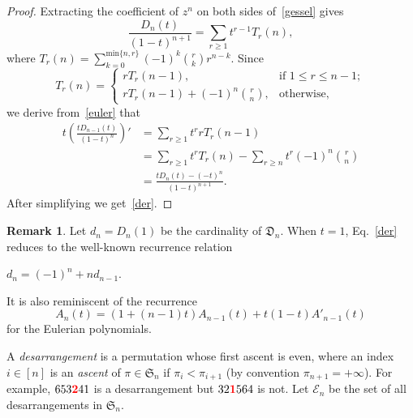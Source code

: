 \documentclass[12pt]{amsart}
\numberwithin{equation}{section}
\def\red{\textcolor{red}}
\theoremstyle{plain}
\theoremstyle{definition}
\newtheorem{remark}[theorem]{Remark}
\def\min{\mathrm{min}}
\def\S{\mathfrak{S}}
\def\D{\mathfrak{D}}
\def\E{\mathcal{E}}
\begin{document}
 \begin{proof}
 Extracting the coefficient of $z^n$ on both sides of~\eqref{gessel} gives
 \begin{equation}\label{euler}
 \frac{D_n(t)}{(1-t)^{n+1}}=\sum_{r\geq1}t^{r-1}T_r(n),
 \end{equation}
 where 
$T_r(n)=\sum_{k=0}^{\min\{n,r\}}(-1)^k{r\choose k}r^{n-k}$. Since
 $$
 T_r(n)=
 \begin{cases}
 rT_r(n-1), &\text{if $1\leq r\leq n-1$};\\
 rT_r(n-1)+(-1)^n{r\choose n}, &\text{otherwise},
 \end{cases}
 $$
we derive  from~\eqref{euler} that 
 \begin{align*}
 t\left(\frac{tD_{n-1}(t)}{(1-t)^n}\right)'&=\sum_{r\geq1}t^rrT_r(n-1)\\
 &=\sum_{r\geq1}t^rT_r(n)-\sum_{r\geq n}t^r(-1)^n{r\choose n}\\
 &=\frac{tD_n(t)-(-t)^n}{(1-t)^{n+1}}.
 \end{align*}
 After simplifying we get~\eqref{der}.
 \end{proof}
 \begin{remark} Let $d_n=D_n(1)$ be the cardinality of  $\D_n$. 
 When $t=1$, Eq.~\eqref{der} reduces to the well-known recurrence relation 
 
$ d_n=(-1)^n+nd_{n-1}$.
 

It is also reminiscent of the recurrence 
 \begin{equation}\label{rec:euler}
 A_n(t)=(1+(n-1)t)A_{n-1}(t)+t(1-t)A'_{n-1}(t)
 \end{equation}
for the Eulerian polynomials.
 \end{remark}
 
 
 A {\em desarrangement} is a permutation whose first ascent is  even, where an index $i\in[n]$ is an {\em ascent} of $\pi\in\S_n$ if $\pi_i<\pi_{i+1}$ (by convention $\pi_{n+1}=+\infty$). For example, $653\red{\bf2}41$ is a desarrangement but $32\red{\bf1}564$ is not.  
 Let  $\E_n$ be the set of all desarrangements in $\S_n$.
 
\end{document}
